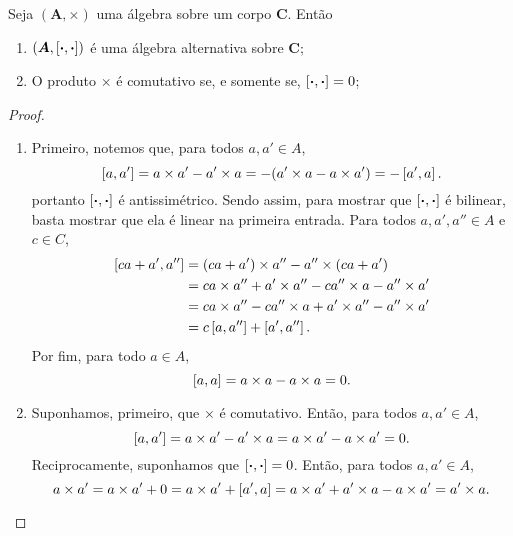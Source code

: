 \begin{proposition}
Seja $(\bm A,\times)$ uma álgebra sobre um corpo $\bm C$. Então
	\begin{enumerate}
	\item $(\bm A,\left[{\bm{\cdot}},{\bm{\cdot}}\right])$ é uma álgebra alternativa sobre $\bm C$;
	\item O produto $\times$ é comutativo se, e somente se, $\left[{\bm{\cdot}},{\bm{\cdot}}\right] = 0$;
	\end{enumerate}
\end{proposition}
\begin{proof}
	\begin{enumerate}
	\item Primeiro, notemos que, para todos $a,a' \in A$,
		\begin{equation*}
		\left[{a},{a'}\right] = a \times a' - a' \times a = -(a' \times a - a \times a') = -\left[{a'},{a}\right].
		\end{equation*}
	portanto $\left[{\bm{\cdot}},{\bm{\cdot}}\right]$ é antissimétrico. Sendo assim, para mostrar que $\left[{\bm{\cdot}},{\bm{\cdot}}\right]$ é bilinear, basta mostrar que ela é linear na primeira entrada. Para todos $a,a',a'' \in A$ e $c \in C$,
		\begin{align*}
		\left[{ca+a'},{a''}\right] &= (ca+a') \times a'' - a'' \times (ca+a') \\
			&= ca \times a'' + a' \times a'' - ca'' \times a - a'' \times a' \\
			&= ca \times a'' - ca'' \times a + a' \times a'' - a'' \times a' \\
			&= c\left[{a},{a''}\right] + \left[{a'},{a''}\right].
		\end{align*}
	Por fim, para todo $a \in A$,
		\begin{equation*}
		\left[{a},{a}\right] = a \times a - a \times a = 0.
		\end{equation*}

	\item Suponhamos, primeiro, que $\times$ é comutativo. Então, para todos $a,a' \in A$,
		\begin{equation*}
		\left[{a},{a'}\right] = a \times a' - a' \times a = a \times a' - a \times a' = 0.
		\end{equation*}
Reciprocamente, suponhamos que $\left[{\bm{\cdot}},{\bm{\cdot}}\right]=0$. Então, para todos $a,a' \in A$,
		\begin{equation*}
		a \times a' = a \times a' + 0 = a \times a' + \left[{a'},{a}\right] = a \times a' + a' \times a - a \times a' = a' \times a.
		\end{equation*}
	\end{enumerate}
\end{proof}
	
